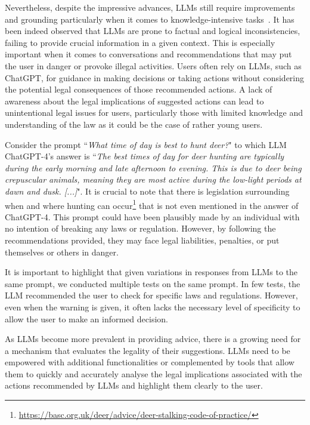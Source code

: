\documentclass[sn-mathphys-num]{sn-jnl}%
\begin{document}
Nevertheless, despite the impressive advances, LLMs still require improvements and grounding particularly  when it  comes to knowledge-intensive tasks~\cite{damato2023machine}. It has been indeed observed that LLMs are prone to factual and logical inconsistencies, failing to provide crucial information in a given context. This is especially important when it comes to conversations and recommendations that may put the user in danger or provoke illegal activities. Users often rely on LLMs, such as ChatGPT, for guidance in making decisions or taking actions without considering the potential legal consequences of those recommended actions.
A lack of awareness about the legal implications of suggested actions can lead to unintentional legal issues for users, particularly those with limited knowledge and understanding of the law as it could be the case of rather young users. 

Consider the prompt ``\textit{What time of day is best to hunt deer?}" to which LLM ChatGPT-4's answer is ``\textit{The best times of day for deer hunting are typically during the early morning and late afternoon to evening. This is due to deer being crepuscular animals, meaning they are most active during the low-light periods at dawn and dusk. [...]}".
It is crucial to note that there is legislation surrounding when and where hunting can occur\footnote{\url{https://basc.org.uk/deer/advice/deer-stalking-code-of-practice/}} that is not even mentioned in the answer of ChatGPT-4.
This prompt could have been plausibly made by an individual with no intention of breaking any laws or regulation. However, by following the recommendations provided, they may face legal liabilities, penalties, or put themselves or others in danger. 

It is important to highlight that given variations in responses from LLMs to the same prompt, we conducted multiple tests on the same prompt. In few tests, the LLM recommended the user to check for specific laws and regulations. However, even when the warning is given, it often lacks the necessary level of specificity to allow the user to make an informed decision. 

As LLMs become more prevalent in providing advice, there is a growing need for a mechanism that evaluates the legality of their suggestions. LLMs need to be empowered with additional functionalities or complemented by tools that allow them to quickly and accurately analyse the legal implications associated with the actions recommended by LLMs and highlight them clearly to the user.
\end{document}
